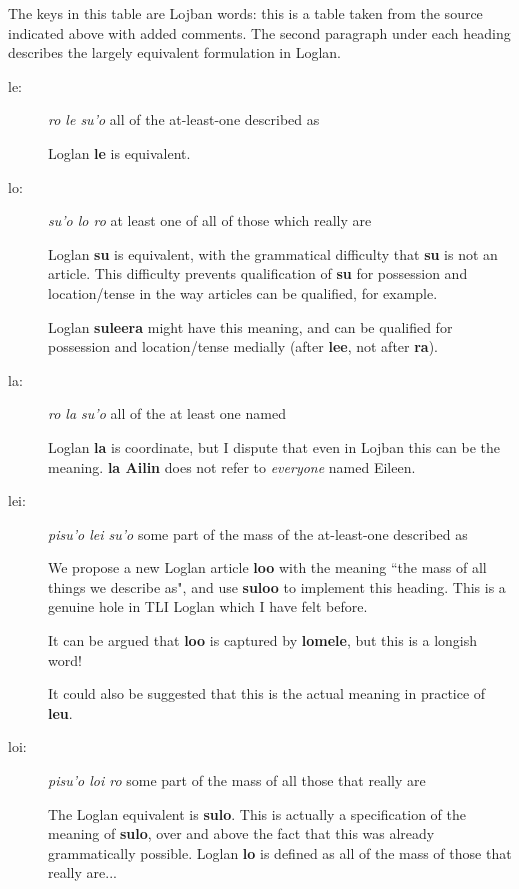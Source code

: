\documentclass[12pt]{book}
\begin{document}
{The keys in this table are Lojban words:  this is a table taken from the source indicated above with added comments.  The second paragraph under each heading describes the largely equivalent formulation in Loglan.  

\begin{description}
\item[le: ]	{\em ro le su'o \/}	all of the at-least-one described as

Loglan {\bf le} is equivalent.

\item[lo: ]	{\em su'o lo ro \/}	at least one of all of those which really are

Loglan {\bf su\/} is equivalent, with the grammatical difficulty that {\bf su\/} is not an article.  This difficulty prevents
qualification of {\bf su} for possession and location/tense in the way articles can be qualified, for example.

Loglan {\bf suleera} might have this meaning, and can be qualified for possession and location/tense medially (after {\bf lee}, not after {\bf ra}).

\item[la: ]	{\em ro la su'o \/}	all of the at least one named

Loglan {\bf la} is coordinate, but I dispute that even in Lojban this can be the meaning.  {\bf la Ailin} does not refer to {\em everyone\/} named Eileen.

\item[lei: ]	{\em pisu'o lei su'o \/}	some part of the mass of the at-least-one described as

We propose a new Loglan article {\bf loo} with the meaning ``the mass of all things we describe as", and use {\bf suloo} to implement this heading.  This is a genuine hole in TLI Loglan which I have felt before.

It can be argued that {\bf loo} is captured by {\bf lomele}, but this is a longish word!

It could also be suggested that this is the actual meaning in practice of {\bf leu}.

\item[loi: ]	{\em pisu'o loi ro\/} 	some part of the mass of all those that really are

The Loglan equivalent is {\bf sulo}.  This is actually a specification of the meaning of {\bf sulo}, over and above the fact that this was already grammatically possible.  Loglan {\bf lo} is defined as all of the mass of those that really are...


\end{description}}
\end{document}
